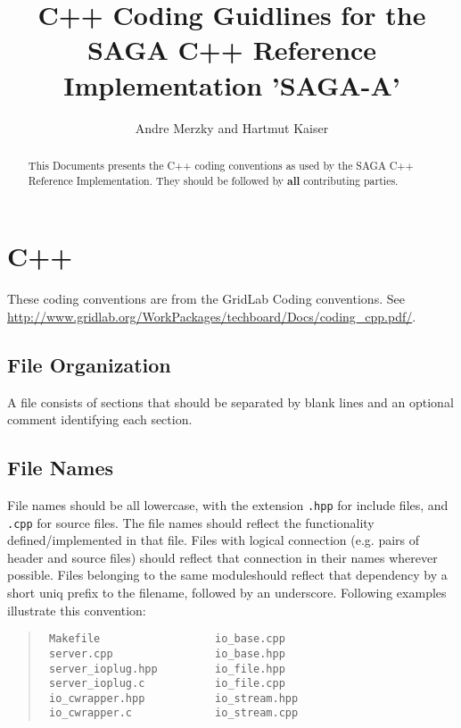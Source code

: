 \documentclass{article}
\begin{document}
\title{C++ Coding Guidlines for the SAGA C++ Reference Implementation
       'SAGA-A'}
\author{Andre Merzky and Hartmut Kaiser\footnotemark}
\maketitle


\begin{abstract}

  This Documents presents the C++ coding conventions as used by the
  SAGA C++ Reference Implementation.  They should be followed by
  \textbf{all} contributing parties.

\end{abstract}

\tableofcontents

\section{C++}

These coding conventions are from the GridLab Coding conventions. See
\url{http://www.gridlab.org/WorkPackages/techboard/Docs/coding_cpp.pdf/}.

\subsection{File Organization}

A file consists of sections that should be separated by blank lines
and an optional comment identifying each section.

\subsection{File Names}

File names should be all lowercase, with the extension \texttt{.hpp}
for include files, and \texttt{.cpp} for source files. The file
names should reflect the functionality defined/implemented in that
file.  Files with logical connection (e.g. pairs of header and source
files) should reflect that connection in their names wherever
possible.  Files belonging to the same moduleshould reflect that
dependency by a short uniq prefix to the filename, followed by an
underscore.  Following examples illustrate this convention:

\begin{quote}
\begin{verbatim}
 Makefile                  io_base.cpp
 server.cpp                io_base.hpp
 server_ioplug.hpp         io_file.hpp
 server_ioplug.c           io_file.cpp
 io_cwrapper.hpp           io_stream.hpp
 io_cwrapper.c             io_stream.cpp
\end{verbatim}
\end{quote}
\end{document}
